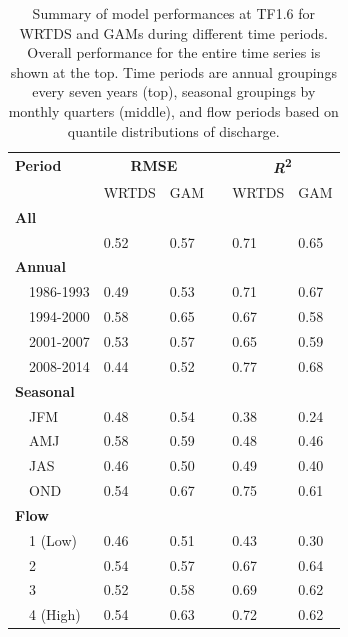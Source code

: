 \documentclass[letterpaper,12pt,oneside]{article}\usepackage[]{graphicx}\usepackage[]{color}
\begin{document}
\begin{table}[!tbp]
\caption{Summary of model performances at TF1.6 for \ac{WRTDS} and \acp{GAM} during different time periods.  Overall performance for the entire time series is shown at the top.  Time periods are annual groupings every seven years (top), seasonal groupings by monthly quarters (middle), and flow periods based on quantile distributions of discharge.\label{tab:perfTF16}} 
\begin{center}
\begin{tabular}{lllcll}
\hline\hline
\multicolumn{1}{l}{\bfseries Period}&\multicolumn{2}{c}{\bfseries RMSE}&\multicolumn{1}{c}{\bfseries }&\multicolumn{2}{c}{\bfseries {\bf \textit{R}\textsuperscript{2}}}\tabularnewline
\cline{2-3} \cline{5-6}
\multicolumn{1}{l}{}&\multicolumn{1}{c}{WRTDS}&\multicolumn{1}{c}{GAM}&\multicolumn{1}{c}{}&\multicolumn{1}{c}{WRTDS}&\multicolumn{1}{c}{GAM}\tabularnewline
\hline
{\bfseries All}&&&&&\tabularnewline
~~&0.52&0.57&&0.71&0.65\tabularnewline
\hline
{\bfseries Annual}&&&&&\tabularnewline
~~1986-1993&0.49&0.53&&0.71&0.67\tabularnewline
~~1994-2000&0.58&0.65&&0.67&0.58\tabularnewline
~~2001-2007&0.53&0.57&&0.65&0.59\tabularnewline
~~2008-2014&0.44&0.52&&0.77&0.68\tabularnewline
\hline
{\bfseries Seasonal}&&&&&\tabularnewline
~~JFM&0.48&0.54&&0.38&0.24\tabularnewline
~~AMJ&0.58&0.59&&0.48&0.46\tabularnewline
~~JAS&0.46&0.50&&0.49&0.40\tabularnewline
~~OND&0.54&0.67&&0.75&0.61\tabularnewline
\hline
{\bfseries Flow}&&&&&\tabularnewline
~~1 (Low)&0.46&0.51&&0.43&0.30\tabularnewline
~~2&0.54&0.57&&0.67&0.64\tabularnewline
~~3&0.52&0.58&&0.69&0.62\tabularnewline
~~4 (High)&0.54&0.63&&0.72&0.62\tabularnewline
\hline
\end{tabular}\end{center}

\end{table}
\end{document}
